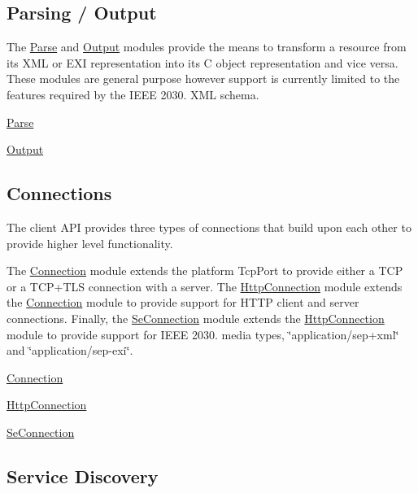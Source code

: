 \subsection*{Parsing / Output }

The \hyperlink{group__parse}{Parse} and \hyperlink{group__output}{Output} modules provide the means to transform a resource from its X\+ML or E\+XI representation into its C object representation and vice versa. These modules are general purpose however support is currently limited to the features required by the I\+E\+EE 2030. X\+ML schema.


\begin{DoxyItemize}
\item \hyperlink{group__parse}{Parse}
\item \hyperlink{group__output}{Output}
\end{DoxyItemize}

\subsection*{Connections }

The client A\+PI provides three types of connections that build upon each other to provide higher level functionality.

The \hyperlink{group__connection}{Connection} module extends the platform {\ttfamily Tcp\+Port} to provide either a T\+CP or a T\+C\+P+\+T\+LS connection with a server. The \hyperlink{group__http__connection}{Http\+Connection} module extends the \hyperlink{group__connection}{Connection} module to provide support for H\+T\+TP client and server connections. Finally, the \hyperlink{group__se__connection}{Se\+Connection} module extends the \hyperlink{group__http__connection}{Http\+Connection} module to provide support for I\+E\+EE 2030. media types, \char`\"{}application/sep+xml\char`\"{} and \char`\"{}application/sep-\/exi\char`\"{}.


\begin{DoxyItemize}
\item \hyperlink{group__connection}{Connection}
\item \hyperlink{group__http__connection}{Http\+Connection}
\item \hyperlink{group__se__connection}{Se\+Connection}
\end{DoxyItemize}

\subsection*{Service Discovery }

